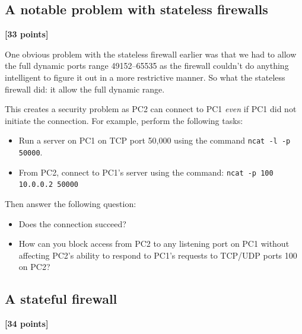 \documentclass[pdftex,12pt,a4paper]{article}
\begin{document}
        \subsection{A notable problem with stateless firewalls}
            \begin{flushright}
                \textbf{[33 points]}
            \end{flushright}

            One obvious problem with the stateless firewall earlier was that we
            had to allow the full dynamic ports range 49152--65535 as the
            firewall couldn't do anything intelligent to figure it out in a
            more restrictive manner. So what the stateless firewall did: it
            allow the full dynamic range.

            This creates a security problem as PC2 can connect to PC1
            \emph{even} if PC1 did not initiate the connection. For example,
            perform the following tasks:
            \begin{itemize}
                \item Run a server on PC1 on TCP port 50,000 using the command
                    \texttt{ncat -l -p 50000}.
                \item From PC2, connect to PC1's server using the command:
                    \texttt{ncat -p 100 10.0.0.2 50000}
            \end{itemize}

            Then answer the following question:
            \begin{itemize}
                \item Does the connection succeed?
                \item How can you block access from PC2 to any listening port on PC1
                    without affecting PC2's ability to respond to PC1's
                    requests to TCP/UDP ports 100 on PC2?
            \end{itemize}


        \subsection{A stateful firewall}
            \begin{flushright}
                \textbf{[34 points]}
            \end{flushright}
\end{document}
